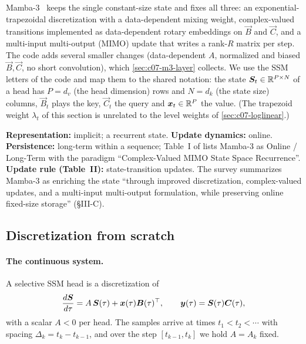 Mamba-3~\citep{lahoti2026mamba3} keeps the single constant-size state and fixes all three:
an exponential-trapezoidal discretization with a data-dependent mixing weight, complex-valued
transitions implemented as data-dependent rotary embeddings on $\vec B$ and $\vec C$, and a
multi-input multi-output (MIMO) update that writes a rank-$R$ matrix per step. The code adds
several smaller changes (data-dependent $A$, normalized and biased $\vec B,\vec C$, no short
convolution), which \cref{sec:c07-m3-layer} collects. We use the SSM letters of the code and
map them to the shared notation: the state $\bm{S}_t\in\mathbb{R}^{P\times N}$ of a head has $P = d_v$
(the head dimension) rows and $N = d_k$ (the state size) columns, $\vec B_t$ plays the key,
$\vec C_t$ the query and $\bm{x}_t\in\mathbb{R}^P$ the value. (The trapezoid weight $\lambda_t$ of this
section is unrelated to the level weights of \cref{sec:c07-loglinear}.)

\begin{taxonomy}
\textbf{Representation:} implicit; a recurrent state. \textbf{Update dynamics:} online.
\textbf{Persistence:} long-term within a sequence; Table~I of \citet{zhoubian2026memory} lists
Mamba-3 as Online / Long-Term with the paradigm ``Complex-Valued MIMO State Space Recurrence''. \textbf{Update rule (Table~II):} state-transition
updates. The survey summarizes Mamba-3 as enriching the state ``through improved
discretization, complex-valued updates, and a multi-input multi-output formulation, while
preserving online fixed-size storage'' (\S III-C).
\end{taxonomy}

\subsection{Discretization from scratch}\label{sec:c07-disc}

\paragraph{The continuous system.} A selective SSM head is a discretization of
\begin{equation}\label{eq:c07-ode}
  \frac{d\bm{S}}{d\tau} = A\,\bm{S}(\tau) + \bm{x}(\tau)\bm{B}(\tau)^{\top}, \qquad \bm{y}(\tau) = \bm{S}(\tau)\bm{C}(\tau),
\end{equation}
with a scalar $A<0$ per head. The samples arrive at times $t_1 < t_2 < \cdots$ with spacing
$\Delta_k = t_k - t_{k-1}$, and over the step $[t_{k-1},t_k]$ we hold $A = A_k$ fixed.

